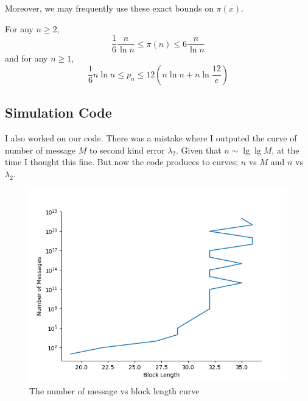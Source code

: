 \documentclass{article}
\begin{document}
Moreover, we may frequently use these exact bounds on \(\pi(x)\).
\begin{lemma}\label{lmm:ineqpnt}
	For any \(n \geq 2\), 
	\begin{equation*}
		\dfrac{1}{6} \dfrac{n}{\ln n} \leq \pi(n) \leq 6 \dfrac{n}{\ln n}
	\end{equation*}
	and for any \(n \geq 1\),
	\begin{equation*}
		\dfrac{1}{6} n \ln n \leq p_n \leq 12 (n \ln n + n \ln \frac{12}{e})
	\end{equation*}
\end{lemma}
\subsection{Simulation Code}
I also worked on our code. There was a mistake where I outputed the curve of number of message \(M\)  to second kind error  \(\lambda_2\). Given that \(n \sim \lg \lg M\), at the time I thought this fine. But now the code produces to curves; \(n\) vs \(M\) and \(n\) vs \(\lambda_2\). 
\begin{figure}
	\includegraphics*[height = 0.4 \textheight]{graphic/MessageVsBlocklength.png}
	\caption{The number of message vs block length curve}
\end{figure}
\end{document}
